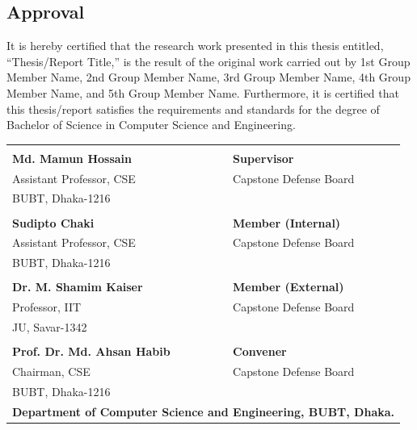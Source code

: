 \begin{center}
    \section*{Approval}
\end{center}

\noindent
It is hereby certified that the research work presented in this thesis entitled, “Thesis/Report Title,” is the result of the original work carried out by 1st Group Member Name, 2nd Group Member Name, 3rd Group Member Name, 4th Group Member Name, and 5th Group Member Name. Furthermore, it is certified that this thesis/report satisfies the requirements and standards for the degree of Bachelor of Science in Computer Science and Engineering.


\vspace{10mm}


\begin{table}[!h]
\centering
\renewcommand{\arraystretch}{1.7}

\begin{tabular*}{\textwidth}{@{\extracolsep{\fill}} p{} >{\raggedleft\arraybackslash}p{}}

\underline{\hspace{6cm}} &
\\[-0.1cm]
\textbf{Md. Mamun Hossain} &
\textbf{Supervisor} \\
Assistant Professor, CSE &
Capstone Defense Board \\
BUBT, Dhaka-1216 &
\\[0.8cm]

\underline{\hspace{6cm}} &
\\[-0.1cm]
\textbf{Sudipto Chaki} &
\textbf{Member (Internal)} \\
Assistant Professor, CSE &
Capstone Defense Board \\
BUBT, Dhaka-1216 &
\\[0.8cm]

\underline{\hspace{6cm}} &
\\[-0.1cm]
\textbf{Dr. M. Shamim Kaiser} &
\textbf{Member (External)} \\
Professor, IIT &
Capstone Defense Board \\
JU, Savar-1342 &
\\[0.8cm]

\underline{\hspace{6cm}} &
\\[-0.1cm]
\textbf{Prof. Dr. Md. Ahsan Habib} &
\textbf{Convener} \\
Chairman, CSE &
Capstone Defense Board \\
BUBT, Dhaka-1216 &
\\[1cm]

\multicolumn{2}{c}{\textbf{Department of Computer Science and Engineering, BUBT, Dhaka.}}\\
\end{tabular*}
\end{table}

